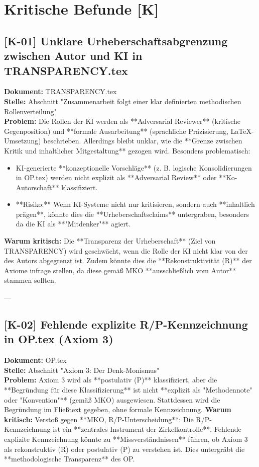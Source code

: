\documentclass[11pt,a4paper]{article}
\begin{document}
\section*{Kritische Befunde [K]}

\subsection*{[K-01] Unklare Urheberschaftsabgrenzung zwischen Autor und KI in TRANSPARENCY.tex}
\textbf{Dokument:} TRANSPARENCY.tex \\
\textbf{Stelle:} Abschnitt "Zusammenarbeit folgt einer klar definierten methodischen Rollenverteilung" \\
\textbf{Problem:}
Die Rollen der KI werden als **Adversarial Reviewer** (kritische Gegenposition) und **formale Ausarbeitung** (sprachliche Präzisierung, LaTeX-Umsetzung) beschrieben. Allerdings bleibt unklar, wie die **Grenze zwischen Kritik und inhaltlicher Mitgestaltung** gezogen wird. Besonders problematisch:
\begin{itemize}
    \item KI-generierte **konzeptionelle Vorschläge** (z. B. logische Konsolidierungen in OP.tex) werden nicht explizit als **Adversarial Review** oder **Ko-Autorschaft** klassifiziert.
    \item **Risiko:** Wenn KI-Systeme nicht nur kritisieren, sondern auch **inhaltlich prägen**, könnte dies die **Urheberschaftsclaims** untergraben, besonders da die KI als **"Mitdenker"** agiert.
\end{itemize}
\textbf{Warum kritisch:}
Die **Transparenz der Urheberschaft** (Ziel von TRANSPARENCY) wird geschwächt, wenn die Rolle der KI nicht klar von der des Autors abgegrenzt ist. Zudem könnte dies die **Rekonstruktivität (R)** der Axiome infrage stellen, da diese gemäß MKO **ausschließlich vom Autor** stammen sollten.

---

\subsection*{[K-02] Fehlende explizite R/P-Kennzeichnung in OP.tex (Axiom 3)}
\textbf{Dokument:} OP.tex \\
\textbf{Stelle:} Abschnitt "Axiom 3: Der Denk-Monismus" \\
\textbf{Problem:}
Axiom 3 wird als **postulativ (P)** klassifiziert, aber die **Begründung für diese Klassifizierung** ist nicht **explizit als "Methodennote" oder "Konvention"** (gemäß MKO) ausgewiesen. Stattdessen wird die Begründung im Fließtext gegeben, ohne formale Kennzeichnung.
\textbf{Warum kritisch:}
Verstoß gegen **MKO, R/P-Unterscheidung**: Die R/P-Kennzeichnung ist ein **zentrales Instrument der Zirkelkontrolle**. Fehlende explizite Kennzeichnung könnte zu **Missverständnissen** führen, ob Axiom 3 als rekonstruktiv (R) oder postulativ (P) zu verstehen ist. Dies untergräbt die **methodologische Transparenz** des OP.
\end{document}
